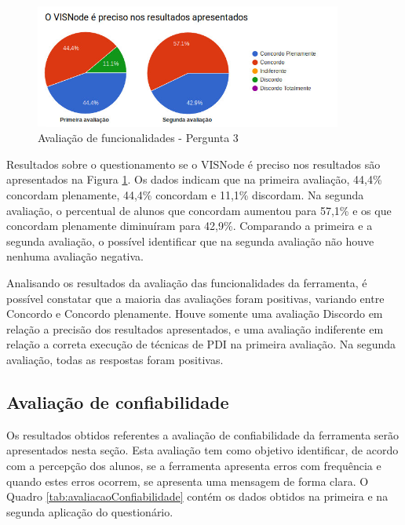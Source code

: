 \documentclass[
	12pt,				%
	oneside,			%
	a4paper,			%
	english,			%
	french,				%
	spanish,			%
	brazil,				%
	]{abntex2}
\begin{document}
\begin{figure}[H]
\centering
\caption{Avaliação de funcionalidades - Pergunta 3}\label{fig:avaliacaoFuncionalidades3}
\includegraphics[width=0.9\textwidth]{imagens/avaliacoes/avaliacao_funcionalidade_3.jpg}
\sourceAuthor
\end{figure}

Resultados sobre o questionamento se o VISNode é preciso nos resultados são apresentados na Figura \ref{fig:avaliacaoFuncionalidades3}. Os dados indicam que na primeira avaliação, 44,4\% concordam plenamente, 44,4\% concordam e 11,1\% discordam. Na segunda avaliação, o percentual de alunos que concordam aumentou para 57,1\% e os que concordam plenamente diminuíram para 42,9\%. Comparando a primeira e a segunda avaliação, o possível identificar que na segunda avaliação não houve nenhuma avaliação negativa.

Analisando os resultados da avaliação das funcionalidades da ferramenta, é possível constatar que a maioria das avaliações foram positivas, variando entre Concordo e Concordo plenamente. Houve somente uma avaliação Discordo em relação a precisão dos resultados apresentados, e uma avaliação indiferente em relação a correta execução de técnicas de PDI na primeira avaliação. Na segunda avaliação, todas as respostas foram positivas.

\subsection{Avaliação de confiabilidade}

Os resultados obtidos referentes a avaliação de confiabilidade da ferramenta serão apresentados nesta seção. Esta avaliação tem como objetivo identificar, de acordo com a percepção dos alunos, se a ferramenta apresenta erros com frequência e quando estes erros ocorrem, se apresenta uma mensagem de forma clara. O Quadro \ref{tab:avaliacaoConfiabilidade} contém os dados obtidos na primeira e na segunda aplicação do questionário. 
\end{document}
